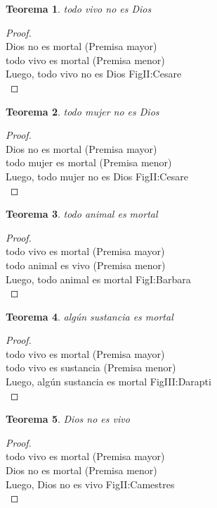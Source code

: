 ﻿\documentclass[12pt]{book}
\newtheorem{theorem}{Teorema}[chapter]
\newtheorem{proof}{Demostración}
\begin{document}
\begin{theorem}
todo vivo no es Dios
\label{th: 29}
\end{theorem}\begin{proof}\\Dios no es mortal	 (Premisa mayor) \\todo vivo es mortal	 (Premisa menor) \\Luego, todo vivo no es Dios	FigII:Cesare \\ \end{proof}
\begin{theorem}
todo mujer no es Dios
\label{th: 30}
\end{theorem}\begin{proof}\\Dios no es mortal	 (Premisa mayor) \\todo mujer es mortal	 (Premisa menor) \\Luego, todo mujer no es Dios	FigII:Cesare \\ \end{proof}
\begin{theorem}
todo animal es mortal
\label{th: 31}
\end{theorem}\begin{proof}\\todo vivo es mortal	 (Premisa mayor) \\todo animal es vivo	 (Premisa menor) \\Luego, todo animal es mortal	FigI:Barbara \\ \end{proof}
\begin{theorem}
algún sustancia es mortal
\label{th: 32}
\end{theorem}\begin{proof}\\todo vivo es mortal	 (Premisa mayor) \\todo vivo es sustancia	 (Premisa menor) \\Luego, algún sustancia es mortal	FigIII:Darapti \\ \end{proof}
\begin{theorem}
Dios no es vivo
\label{th: 33}
\end{theorem}\begin{proof}\\todo vivo es mortal	 (Premisa mayor) \\Dios no es mortal	 (Premisa menor) \\Luego, Dios no es vivo	FigII:Camestres \\ \end{proof}
\end{document}
